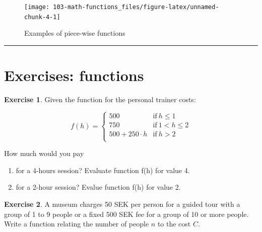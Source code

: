 \documentclass[
]{book}
\providecommand{\tightlist}{%
  \setlength{\itemsep}{0pt}\setlength{\parskip}{0pt}}
\theoremstyle{definition}
\theoremstyle{definition}
\theoremstyle{definition}
\newtheorem{exercise}{Exercise}[chapter]
\theoremstyle{remark}
\begin{document}
\begin{figure}

{\centering \texttt{[image: 103-math-functions\_files/figure-latex/unnamed-chunk-4-1]} 

}

\caption{Examples of piece-wise functions}\label{fig:unnamed-chunk-4}
\end{figure}

\begin{center}\rule{0.5\linewidth}{0.5pt}\end{center}

\hypertarget{exercises-functions}{%
\section{Exercises: functions}\label{exercises-functions}}

\begin{exercise}
\protect\hypertarget{exr:m-functions-evaluate-01}{}{\label{exr:m-functions-evaluate-01} }
Given the function for the personal trainer costs:

\begin{equation}
    f(h) =
    \left\{
        \begin{array}{cc}
                500  & \mathrm{if\ } h \le 1 \\
                750  & \mathrm{if\ } 1 < h \le 2 \\
                500 + 250 \cdot h & \mathrm{if\ } h > 2 \\
        \end{array}
    \right.
\end{equation}

How much would you pay

\begin{enumerate}
\def\labelenumi{\alph{enumi})}
\tightlist
\item
  for a 4-hours session? Evaluate function f(h) for value 4.
\item
  for a 2-hour session? Evalue function f(h) for value 2.
\end{enumerate}
\end{exercise}

\begin{exercise}
\protect\hypertarget{exr:m-functions-write}{}{\label{exr:m-functions-write} }
A museum charges 50 SEK per person for a guided tour with a group of 1 to 9 people or a fixed 500 SEK fee for a group of 10 or more people. Write a function relating the number of people \(n\) to the cost \(C\).
\end{exercise}
\end{document}
